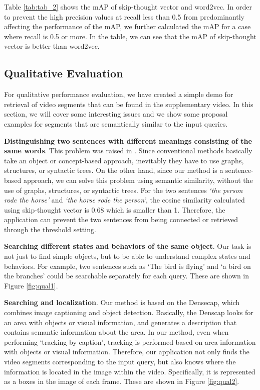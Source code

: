 Table \textcolor{red}{\ref{tab:tab_2}} shows the mAP of skip-thought vector and word2vec. In order to prevent the high precision values at recall less than 0.5 from predominantly affecting the performance of the mAP, we further calculated the mAP for a case where recall is 0.5 or more. 
In the table, we can see that the mAP of skip-thought vector is better than word2vec.



%
\subsection{Qualitative Evaluation}
\label{QualEval}

For qualitative performance evaluation, we have created a simple demo for retrieval of video segments that can be found in the supplementary video. In this section, we will cover some interesting issues and we show some proposal examples for segments that are semantically similar to the input queries. 
%

\textbf{Distinguishing two sentences with different meanings consisting of the same words}. 
This problem was raised in \cite{barrett2016saying}. Since conventional methods basically take an object or concept-based approach, inevitably they have to use graphs, structures, or syntactic trees.
On the other hand, since our method is a sentence-based approach, we can solve this problem using semantic similarity, without the use of graphs, structures, or syntactic trees.
For the two sentences \textit{`the person rode the horse'} and \textit{`the horse rode the person'}, the cosine similarity calculated using skip-thought vector is 0.68 which is smaller than 1. Therefore, the application can prevent the two sentences from being connected or retrieved through the threshold setting. 

\textbf{Searching different states and behaviors of the same object}. Our task is not just to find simple objects, but to be able to understand complex states and behaviors. For example, two sentences such as `The bird is flying' and `a bird on the branches' could be searchable separately for each query. These are shown in Figure \textcolor{red}{\ref{fig:qual1}}.

\textbf{Searching and localization}. Our method is based on the Densecap, which combines image captioning and object detection. Basically, the Denscap looks for an area with objects or visual information, and generates a description that contains semantic information about the area. In our method, even when performing `tracking by caption', tracking is performed based on area information with objects or visual information.
Therefore, our application not only finds the video segments corresponding to the input query, but also knows where the information is located in the image within the video. Specifically, it is represented as a boxes in the image of each frame. These are shown in Figure \textcolor{red}{\ref{fig:qual2}}.

